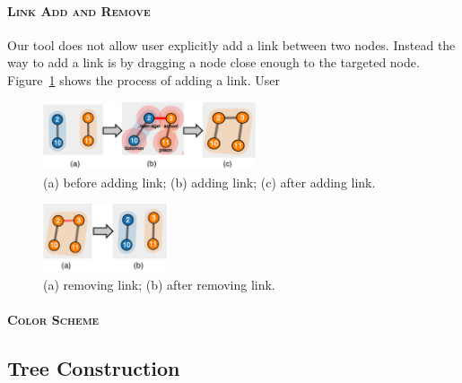 \paragraph{\textsc{Link Add and Remove}\\}
Our tool does not allow user explicitly add a link between two nodes. Instead the way to add a link is by dragging a node close enough to the targeted node. Figure~\ref{fig:addlink} shows the process of adding a link. User

\begin{figure}[th]
\begin{center}
\includegraphics[height=2cm]{figs/addlink.pdf}
\caption{(a) before adding link; (b) adding link; (c) after adding link.}
\label{fig:addlink}
\end{center}
\end{figure}

\begin{figure}[th]
\begin{center}
\includegraphics[height=2cm]{figs/removeLink.pdf}
\caption{(a) removing link; (b) after removing link.}
\label{fig:rmlink}
\end{center}
\end{figure}

\paragraph{\textsc{Color Scheme}\\}

\subsection{Tree Construction}

